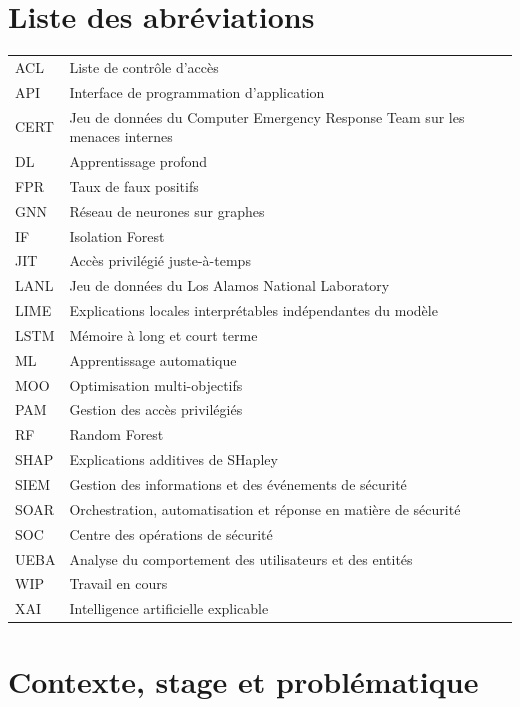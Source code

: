 \documentclass[11pt,a4paper,oneside]{report}
\theoremstyle{definition}
\theoremstyle{plain}
\begin{document}
\chapter*{Liste des abréviations}
\begin{longtable}{@{}ll@{}}
ACL & Liste de contrôle d'accès \\
API & Interface de programmation d'application \\
CERT & Jeu de données du Computer Emergency Response Team sur les menaces internes \\
DL & Apprentissage profond \\
FPR & Taux de faux positifs \\
GNN & Réseau de neurones sur graphes \\
IF & Isolation Forest \\
JIT & Accès privilégié juste-à-temps \\
LANL & Jeu de données du Los Alamos National Laboratory \\
LIME & Explications locales interprétables indépendantes du modèle \\
LSTM & Mémoire à long et court terme \\
ML & Apprentissage automatique \\
MOO & Optimisation multi-objectifs \\
PAM & Gestion des accès privilégiés \\
RF & Random Forest \\
SHAP & Explications additives de SHapley \\
SIEM & Gestion des informations et des événements de sécurité \\
SOAR & Orchestration, automatisation et réponse en matière de sécurité \\
SOC & Centre des opérations de sécurité \\
UEBA & Analyse du comportement des utilisateurs et des entités \\
WIP & Travail en cours \\
XAI & Intelligence artificielle explicable \\
\end{longtable}

\tableofcontents
\listoffigures
\listoftables
\clearpage
{}



\chapter{Contexte, stage et problématique}
\label{chap:intro}
\end{document}
